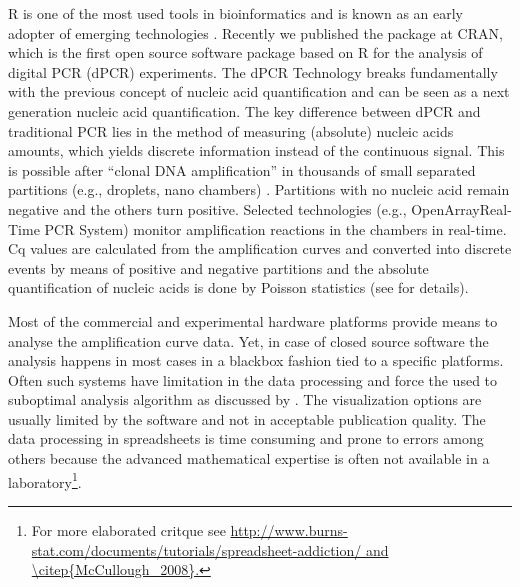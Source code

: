 R is one of the most used tools in bioinformatics and is known as an early 
adopter of emerging technologies \citep{pabinger_2014}. Recently we published 
the  package at CRAN, which is the first open source software 
package based on R for the analysis of digital PCR (dPCR) experiments. The dPCR 
Technology breaks fundamentally with the previous concept of nucleic acid 
quantification and can be seen as a next generation nucleic acid quantification. 
The key difference between dPCR and traditional PCR lies in the method of 
measuring (absolute) nucleic acids amounts, which yields discrete information
instead of the continuous signal. This is possible after ``clonal DNA 
amplification'' in thousands of small separated partitions (e.g., droplets, nano 
chambers) \citep{huggett_2013, milbury_2014, morley_2014}. Partitions with no 
nucleic acid remain negative and the others turn positive. Selected technologies 
(e.g., OpenArray\textregistered Real-Time PCR System) monitor amplification 
reactions in the chambers in real-time. Cq values are calculated from the 
amplification curves and converted into discrete events by means of positive and 
negative partitions and the absolute quantification of nucleic acids is done by 
Poisson statistics (see  for details).

Most of the commercial and experimental hardware platforms provide means to 
analyse the amplification curve data. Yet, in case of closed source software the 
analysis happens in most cases in a blackbox fashion tied to a specific 
platforms. Often such systems have limitation in the data processing and force 
the used to suboptimal analysis algorithm as discussed by \citet{ruijter_2013}. 
The visualization options are usually limited by the software and not in 
acceptable publication quality. The data processing in spreadsheets is time 
consuming and prone to errors among others because the advanced mathematical expertise is 
often not available in a laboratory\footnote{For more elaborated critque see \url{http://www.burns-stat.com/documents/tutorials/spreadsheet-addiction/ and \citep{McCullough_2008}.}}.

